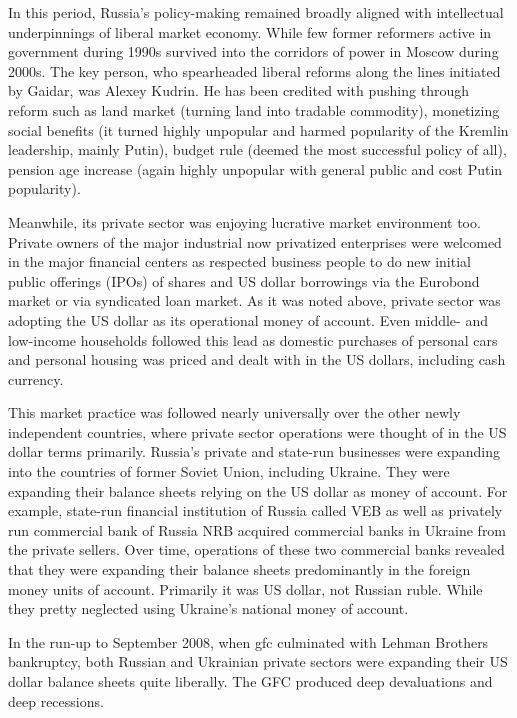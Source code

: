 In this period, Russia's policy-making remained broadly aligned with
intellectual underpinnings of liberal market economy. While few former
reformers active in government during 1990s survived into the corridors
of power in Moscow during 2000s. The key person, who spearheaded liberal
reforms along the lines initiated by Gaidar, was Alexey Kudrin. He has
been credited with pushing through reform such as land market (turning
land into tradable commodity), monetizing social benefits (it turned
highly unpopular and harmed popularity of the Kremlin leadership, mainly
Putin), budget rule (deemed the most successful policy of all), pension
age increase (again highly unpopular with general public and cost Putin
popularity).

Meanwhile, its private sector was enjoying lucrative market environment
too. Private owners of the major industrial now privatized enterprises
were welcomed in the major financial centers as respected business
people to do new initial public offerings (IPOs) of shares and US dollar
borrowings via the Eurobond market or via syndicated loan market. As it
was noted above, private sector was adopting the US dollar as its
operational money of account. Even middle- and low-income
households followed this lead as domestic purchases of personal cars and
personal housing was priced and dealt with in the US dollars, including
cash currency.

This market practice was followed nearly universally over the other
newly independent countries, where private sector operations were
thought of in the US dollar terms primarily. Russia's private and
state-run businesses were expanding into the countries of former Soviet
Union, including Ukraine. They were expanding their balance sheets
relying on the US dollar as money of account. For example,
state-run financial institution of Russia called VEB as well as
privately run commercial bank of Russia NRB acquired commercial banks in
Ukraine from the private sellers. Over time, operations of these two
commercial banks revealed that they were expanding their balance sheets
predominantly in the foreign money units of account. Primarily it was US
dollar, not Russian ruble. While they pretty neglected using Ukraine's
national money of account.

In the run-up to September 2008, when \acf{gfc} culminated with Lehman Brothers bankruptcy, both Russian and Ukrainian private sectors were expanding their US dollar balance sheets quite
liberally. The GFC produced deep devaluations and deep recessions.

